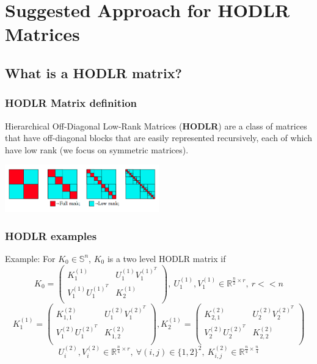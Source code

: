 \documentclass{beamer}
\begin{document}
\section{Suggested Approach for HODLR Matrices}
\subsection{What is a HODLR matrix?}
\begin{frame}
\frametitle{HODLR Matrix definition}
Hierarchical Off-Diagonal Low-Rank Matrices (\textbf{HODLR}) are a class of matrices that have off-diagonal blocks that are easily represented recursively, each of which have low rank (we focus on symmetric matrices).
\begin{center}
 \includegraphics[width=0.5\textwidth]{fig1.png}\end{center}
 \end{frame}
 
 \begin{frame}
 \frametitle{HODLR examples}
 Example:  For $K_0 \in \mathbb{S}^n$, $K_0$ is a two level HODLR matrix if
 $$K_0 = \begin{pmatrix} K_1^{(1)} & U_1^{(1)}V_1^{(1)^T} \\ V_1^{(1)}U_1^{(1)^T} & K_2^{(1)}\\ \end{pmatrix}, \ U_1^{(1)}, V_1^{(1)} \in \mathbb{R}^{\frac{n}{2}\times r}, \ r << n$$
 $$K_1^{(1)} = \begin{pmatrix} K_{1,1}^{(2)} & U_1^{(2)} V_1^{(2)^T} \\ V_1^{(2)} U_1^{(2)^T} & K_{1,2}^{(2)} \\ \end{pmatrix}, K_2^{(1)} = \begin{pmatrix} K_{2,1}^{(2)} & U_2^{(2)} V_2^{(2)^T} \\ V_2^{(2)} U_2^{(2)^T} & K_{2,2}^{(2)} \\ \end{pmatrix}$$ 
$$U_i^{(2)}, V_i^{(2)} \in \mathbb{R}^{\frac{n}{4}\times r}, \ \forall (i,j) \in \{1,2\}^2, \ K_{i,j}^{(2)} \in \mathbb{R}^{\frac{n}{4}\times \frac{n}{4}}$$
\end{frame}
\end{document}
